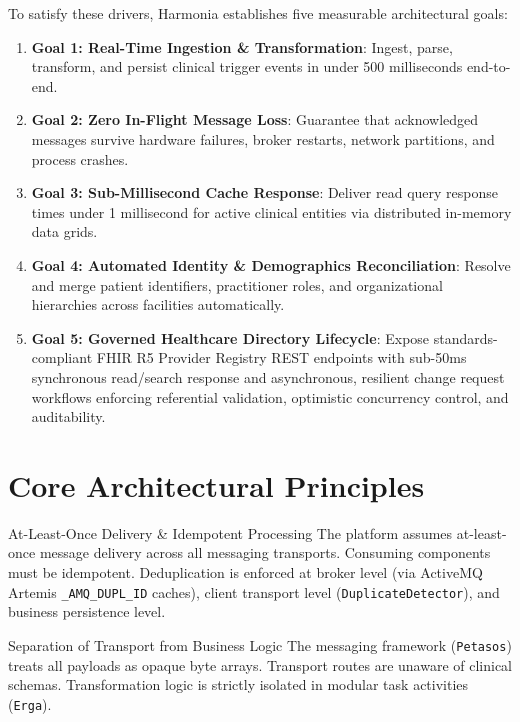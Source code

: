 To satisfy these drivers, Harmonia establishes five measurable architectural goals:
\begin{enumerate}
    \item \textbf{Goal 1: Real-Time Ingestion \& Transformation}: Ingest, parse, transform, and persist clinical trigger events in under 500 milliseconds end-to-end.
    \item \textbf{Goal 2: Zero In-Flight Message Loss}: Guarantee that acknowledged messages survive hardware failures, broker restarts, network partitions, and process crashes.
    \item \textbf{Goal 3: Sub-Millisecond Cache Response}: Deliver read query response times under 1 millisecond for active clinical entities via distributed in-memory data grids.
    \item \textbf{Goal 4: Automated Identity \& Demographics Reconciliation}: Resolve and merge patient identifiers, practitioner roles, and organizational hierarchies across facilities automatically.
    \item \textbf{Goal 5: Governed Healthcare Directory Lifecycle}: Expose standards-compliant FHIR R5 Provider Registry REST endpoints with sub-50ms synchronous read/search response and asynchronous, resilient change request workflows enforcing referential validation, optimistic concurrency control, and auditability.
\end{enumerate}

\section{Core Architectural Principles}

\begin{principlebox}{At-Least-Once Delivery \& Idempotent Processing}
The platform assumes at-least-once message delivery across all messaging transports. Consuming components must be idempotent. Deduplication is enforced at broker level (via ActiveMQ Artemis \texttt{\_AMQ\_DUPL\_ID} caches), client transport level (\texttt{DuplicateDetector}), and business persistence level.
\end{principlebox}

\begin{principlebox}{Separation of Transport from Business Logic}
The messaging framework (\texttt{Petasos}) treats all payloads as opaque byte arrays. Transport routes are unaware of clinical schemas. Transformation logic is strictly isolated in modular task activities (\texttt{Erga}).
\end{principlebox}

